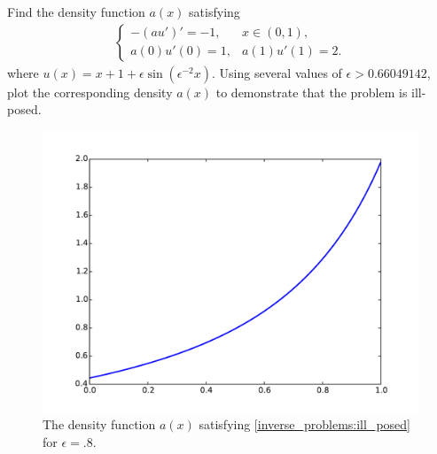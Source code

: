 \begin{problem}
	Find the density function $a(x)$ satisfying 
	\begin{align}
	\begin{cases}
		-(au')' = -1, & x \in (0,1),\\
		a(0)u'(0) = 1, & a(1)u'(1) = 2.
	\end{cases} \label{inverse_problems:ill_posed}
	\end{align}
	where $u(x) = x + 1 + \epsilon \sin(\epsilon^{-2}x)$.  Using several values of $\epsilon  > 0.66049142$, plot the corresponding density $a(x)$ to demonstrate that the problem is ill-posed.
\end{problem}

\begin{figure}
\centering
\includegraphics[width=\textwidth]{ill_posed_density_a.pdf}
\caption{The density function $a(x)$ satisfying \eqref{inverse_problems:ill_posed} for $\epsilon = .8$.}
\label{fig:inverse_problems:exercise1}
\end{figure}







